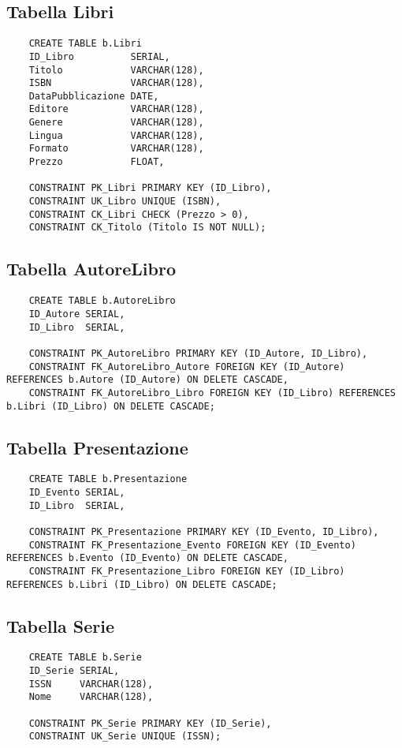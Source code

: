 \subsection{Tabella Libri}
\begin{lstlisting}
    CREATE TABLE b.Libri
    ID_Libro          SERIAL,
    Titolo            VARCHAR(128),
    ISBN              VARCHAR(128),
    DataPubblicazione DATE,
    Editore           VARCHAR(128),
    Genere            VARCHAR(128),
    Lingua            VARCHAR(128),
    Formato           VARCHAR(128),
    Prezzo            FLOAT,

    CONSTRAINT PK_Libri PRIMARY KEY (ID_Libro),
    CONSTRAINT UK_Libro UNIQUE (ISBN),
    CONSTRAINT CK_Libri CHECK (Prezzo > 0),
    CONSTRAINT CK_Titolo (Titolo IS NOT NULL);
\end{lstlisting}

\subsection{Tabella AutoreLibro}
\begin{lstlisting}
    CREATE TABLE b.AutoreLibro
    ID_Autore SERIAL,
    ID_Libro  SERIAL,

    CONSTRAINT PK_AutoreLibro PRIMARY KEY (ID_Autore, ID_Libro),
    CONSTRAINT FK_AutoreLibro_Autore FOREIGN KEY (ID_Autore) REFERENCES b.Autore (ID_Autore) ON DELETE CASCADE,
    CONSTRAINT FK_AutoreLibro_Libro FOREIGN KEY (ID_Libro) REFERENCES b.Libri (ID_Libro) ON DELETE CASCADE;
\end{lstlisting}

\subsection{Tabella Presentazione}
\begin{lstlisting}
    CREATE TABLE b.Presentazione
    ID_Evento SERIAL,
    ID_Libro  SERIAL,

    CONSTRAINT PK_Presentazione PRIMARY KEY (ID_Evento, ID_Libro),
    CONSTRAINT FK_Presentazione_Evento FOREIGN KEY (ID_Evento) REFERENCES b.Evento (ID_Evento) ON DELETE CASCADE,
    CONSTRAINT FK_Presentazione_Libro FOREIGN KEY (ID_Libro) REFERENCES b.Libri (ID_Libro) ON DELETE CASCADE;
\end{lstlisting}

\subsection{Tabella Serie}
\begin{lstlisting}
    CREATE TABLE b.Serie
    ID_Serie SERIAL,
    ISSN     VARCHAR(128),
    Nome     VARCHAR(128),

    CONSTRAINT PK_Serie PRIMARY KEY (ID_Serie),
    CONSTRAINT UK_Serie UNIQUE (ISSN);
\end{lstlisting}

